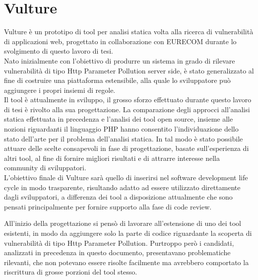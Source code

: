 \chapter{Vulture}
Vulture\cite{vulture} è un prototipo di tool per analisi statica volta alla ricerca di vulnerabilità di applicazioni web, progettato in collaborazione con EURECOM durante lo svolgimento di questo lavoro di tesi.\\
Nato inizialmente con l'obiettivo di produrre un sistema in grado di rilevare vulnerabilità di tipo Http Parameter Pollution server side, è stato generalizzato al fine di costruire una piattaforma estensibile, alla quale lo sviluppatore può aggiungere i propri insiemi di regole.\\
Il tool è attualmente in sviluppo, il grosso sforzo effettuato durante questo lavoro di tesi è rivolto alla sua progettazione. La comparazione degli approcci all'analisi statica effettuata in precedenza e l'analisi dei tool open source, insieme alle nozioni riguardanti il linguaggio PHP hanno consentito l'individuazione dello stato dell'arte per il problema dell'analisi statica. In tal modo è stato possibile attuare delle scelte consapevoli in fase di progettazione, basate sull'esperienza di altri tool, al fine di fornire migliori risultati e di attrarre interesse nella community di sviluppatori.\\
L'obiettivo finale di Vulture sarà quello di inserirsi nel software development life cycle in modo trasparente, risultando adatto ad essere utilizzato direttamente dagli sviluppatori, a differenza dei tool a disposizione attualmente che sono pensati principalmente per fornire supporto alla fase di code review.

All'inizio della progettazione si pensò di lavorare all'estensione di uno dei tool esistenti, in modo da aggiungere solo la parte di codice riguardante la scoperta di vulnerabilità di tipo Http Parameter Pollution. Purtroppo però i candidati, analizzati in precedenza in questo documento, presentavano problematiche rilevanti, che non potevano essere risolte facilmente ma avrebbero comportato la riscrittura di grosse porzioni del tool stesso.

